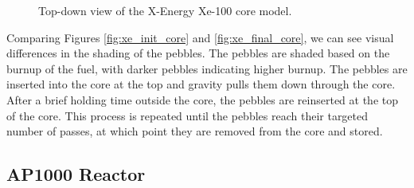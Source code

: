 \begin{figure}[!ht]
    \hfill
    \caption{Top-down view of the X-Energy Xe-100 core model.}
    \label{fig:xe_core}
  \end{figure}

Comparing Figures \ref{fig:xe_init_core} and \ref{fig:xe_final_core}, we can see visual differences in the shading of the pebbles. The pebbles are shaded based on the burnup of the fuel, with darker pebbles indicating higher burnup. The pebbles are inserted into the core at the top and gravity pulls them down through the core. After a brief holding time outside the core, the pebbles are reinserted at the top of the core. This process is repeated until the pebbles reach their targeted number of passes, at which point they are removed from the core and stored.

\subsection{AP1000 Reactor}
\label{sec:ap}

